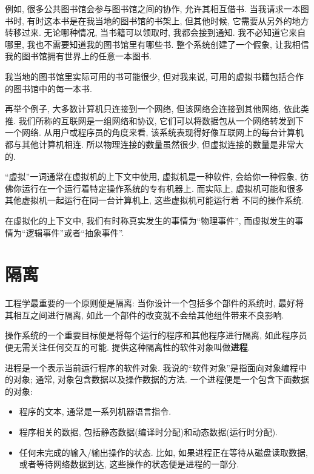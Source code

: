 \documentclass[12pt]{book}
\begin{document}
{\begin{itemize}
例如, 很多公共图书馆会参与图书馆之间的协作, 允许其相互借书.
当我请求一本图书时, 有时这本书是在我当地的图书馆的书架上,
但其他时候, 它需要从另外的地方转移过来.
无论哪种情况, 当书籍可以领取时, 我都会接到通知.
我不必知道它来自哪里, 我也不需要知道我的图书馆里有哪些书.
整个系统创建了一个假象, 让我相信我的图书馆拥有世界上的任意一本图书.

我当地的图书馆里实际可用的书可能很少,
但对我来说, 可用的虚拟书籍包括合作的图书馆中的每一本书.

再举个例子, 大多数计算机只连接到一个网络, 
但该网络会连接到其他网络, 依此类推.
我们所称的互联网是一组网络和协议, 
它们可以将数据包从一个网络转发到下一个网络. 
从用户或程序员的角度来看, 
该系统表现得好像互联网上的每台计算机都与其他计算机相连. 
所以物理连接的数量虽然很少, 但虚拟连接的数量是非常大的.

\end{itemize}

``虚拟''一词通常在虚拟机的上下文中使用, 虚拟机是一种软件, 会给你一种假象,
彷佛你运行在一个运行着特定操作系统的专有机器上.
而实际上, 虚拟机可能和很多其他虚拟机一起运行在同一台计算机上, 这些虚拟机可能运行着
不同的操作系统.

在虚拟化的上下文中, 我们有时称真实发生的事情为``物理事件'', 
而虚拟发生的事情为``逻辑事件''或者``抽象事件''.


\section{隔离}

工程学最重要的一个原则便是隔离:
当你设计一个包括多个部件的系统时, 最好将其相互之间进行隔离,
如此一个部件的改变就不会给其他组件带来不良影响.

操作系统的一个重要目标便是将每个运行的程序和其他程序进行隔离,
如此程序员便无需关注任何交互的可能.
提供这种隔离性的软件对象叫做{\bf 进程}.

进程是一个表示当前运行程序的软件对象.
我说的``软件对象''是指面向对象编程中的对象;
通常, 对象包含数据以及操作数据的方法.
一个进程便是一个包含下面数据的对象:

\begin{itemize}

\item 程序的文本, 通常是一系列机器语言指令.

\item 程序相关的数据, 包括静态数据(编译时分配)和动态数据(运行时分配).

\item 任何未完成的输入/输出操作的状态. 比如, 
  如果进程正在等待从磁盘读取数据, 或者等待网络数据到达, 
  这些操作的状态便是进程的一部分.


\end{itemize}}
\end{document}
